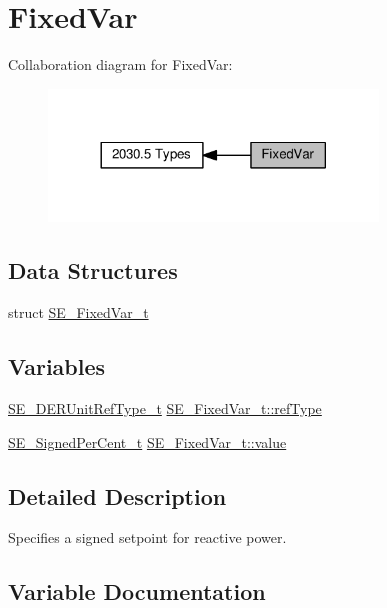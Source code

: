 \hypertarget{group__FixedVar}{}\section{Fixed\+Var}
\label{group__FixedVar}
Collaboration diagram for Fixed\+Var\+:\nopagebreak
\begin{figure}[H]
\begin{center}
\leavevmode
\includegraphics[width=248pt]{group__FixedVar}
\end{center}
\end{figure}
\subsection*{Data Structures}
\begin{DoxyCompactItemize}
\item 
struct \hyperlink{structSE__FixedVar__t}{S\+E\+\_\+\+Fixed\+Var\+\_\+t}
\end{DoxyCompactItemize}
\subsection*{Variables}
\begin{DoxyCompactItemize}
\item 
\hyperlink{group__DERUnitRefType_gaff0b9dcda4cd888095dba6d262e5ce86}{S\+E\+\_\+\+D\+E\+R\+Unit\+Ref\+Type\+\_\+t} \hyperlink{group__FixedVar_ga31589f44bcf481d8498e94522f685e58}{S\+E\+\_\+\+Fixed\+Var\+\_\+t\+::ref\+Type}
\item 
\hyperlink{group__SignedPerCent_ga3a844f23440f7c1756032f6ef2359fdf}{S\+E\+\_\+\+Signed\+Per\+Cent\+\_\+t} \hyperlink{group__FixedVar_gae431366e46ceeb682588ee1bcfcc9de9}{S\+E\+\_\+\+Fixed\+Var\+\_\+t\+::value}
\end{DoxyCompactItemize}


\subsection{Detailed Description}
Specifies a signed setpoint for reactive power. 

\subsection{Variable Documentation}
\mbox{\label{group__FixedVar_ga31589f44bcf481d8498e94522f685e58}} 
